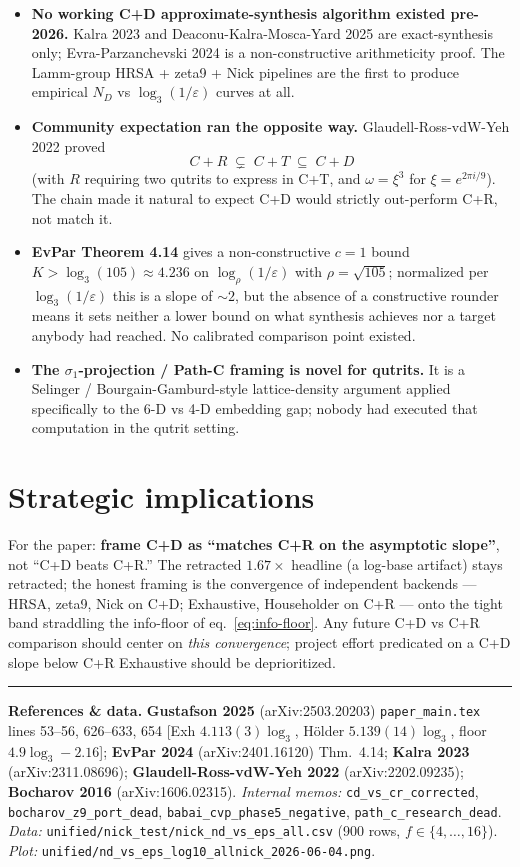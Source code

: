 \documentclass[10pt]{article}
\newcommand{\eps}{\varepsilon}
\begin{document}
\begin{itemize}[leftmargin=*,topsep=2pt,itemsep=2pt]
\item \textbf{No working C{+}D approximate-synthesis algorithm existed pre-2026.} Kalra 2023 and Deaconu-Kalra-Mosca-Yard 2025 are exact-synthesis only; Evra-Parzanchevski 2024 is a non-constructive arithmeticity proof. The Lamm-group HRSA + zeta9 + Nick pipelines are the first to produce empirical $N_D$ vs $\log_3(1/\eps)$ curves at all.
\item \textbf{Community expectation ran the opposite way.} Glaudell-Ross-vdW-Yeh 2022 proved
\[
C{+}R \;\subsetneq\; C{+}T \;\subseteq\; C{+}D
\]
(with $R$ requiring two qutrits to express in C{+}T, and $\omega = \xi^3$ for $\xi = e^{2\pi i/9}$). The chain made it natural to expect C{+}D would strictly out-perform C{+}R, not match it.
\item \textbf{EvPar Theorem 4.14} gives a non-constructive $c{=}1$ bound $K > \log_3(105) \approx 4.236$ on $\log_\rho(1/\eps)$ with $\rho=\sqrt{105}$; normalized per $\log_3(1/\eps)$ this is a slope of $\sim 2$, but the absence of a constructive rounder means it sets neither a lower bound on what synthesis achieves nor a target anybody had reached. No calibrated comparison point existed.
\item \textbf{The $\sigma_1$-projection / Path-C framing is novel for qutrits.} It is a Selinger / Bourgain-Gamburd-style lattice-density argument applied specifically to the 6-D vs 4-D embedding gap; nobody had executed that computation in the qutrit setting.
\end{itemize}

\section*{Strategic implications}

For the paper: \textbf{frame C{+}D as ``matches C{+}R on the asymptotic slope''}, not ``C{+}D beats C{+}R.'' The retracted $1.67\times$ headline (a log-base artifact) stays retracted; the honest framing is the convergence of independent backends --- HRSA, zeta9, Nick on C{+}D; Exhaustive, Householder on C{+}R --- onto the tight band straddling the info-floor of eq.~\eqref{eq:info-floor}. Any future C{+}D vs C{+}R comparison should center on \emph{this convergence}; project effort predicated on a C{+}D slope below C{+}R Exhaustive should be deprioritized.

\vspace{4pt}\hrule\vspace{2pt}
{\scriptsize\textbf{References \& data.}\;
\textbf{Gustafson 2025} (arXiv:2503.20203) \texttt{paper\_main.tex} lines 53--56, 626--633, 654 [Exh $4.113(3)\log_3$, H\"older $5.139(14)\log_3$, floor $4.9\log_3-2.16$];
\textbf{EvPar 2024} (arXiv:2401.16120) Thm.~4.14;
\textbf{Kalra 2023} (arXiv:2311.08696);
\textbf{Glaudell-Ross-vdW-Yeh 2022} (arXiv:2202.09235);
\textbf{Bocharov 2016} (arXiv:1606.02315).
\emph{Internal memos:} \texttt{cd\_vs\_cr\_corrected}, \texttt{bocharov\_z9\_port\_dead}, \texttt{babai\_cvp\_phase5\_negative}, \texttt{path\_c\_research\_dead}.
\emph{Data:} \texttt{unified/nick\_test/nick\_nd\_vs\_eps\_all.csv} (900 rows, $f\in\{4,\dots,16\}$).
\emph{Plot:} \texttt{unified/nd\_vs\_eps\_log10\_allnick\_2026-06-04.png}.
}
\end{document}
